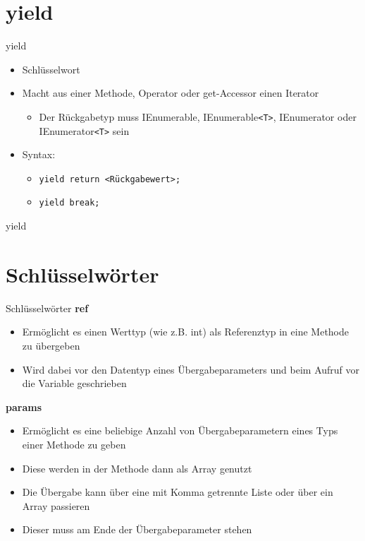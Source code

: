 \section{yield}
\begin{frame}{yield}
	\begin{itemize}
		\item Schlüsselwort
		\item Macht aus einer Methode, Operator oder get-Accessor einen Iterator
		\begin{itemize}
			\item Der Rückgabetyp muss \alert{IEnumerable}, \alert{IEnumerable\texttt{<T>}}, \alert{IEnumerator} oder \alert{IEnumerator\texttt{<T>}} sein
		\end{itemize}
		\item Syntax:
		\begin{itemize}
			\item \texttt{\alert{yield} return \alert{<Rückgabewert>};}
			\item \texttt{\alert{yield} break;}
		\end{itemize}
	\end{itemize}
\end{frame}

\begin{frame}{yield}
		
\end{frame}

\section{Schlüsselwörter}
\begin{frame}{Schlüsselwörter}
	\textbf{ref}\\
	\begin{itemize}
		\item Ermöglicht es einen Werttyp (wie z.B. int) als Referenztyp in eine Methode zu übergeben
		\item Wird dabei vor den Datentyp eines Übergabeparameters und beim Aufruf vor die Variable geschrieben
	\end{itemize}
	\textbf{params}\\
	\begin{itemize}
		\item Ermöglicht es eine beliebige Anzahl von Übergabeparametern eines Typs einer Methode zu geben
		\item Diese werden in der Methode dann als Array genutzt
		\item Die Übergabe kann über eine mit Komma getrennte Liste oder über ein Array passieren
		\item Dieser muss am Ende der Übergabeparameter stehen
	\end{itemize}
\end{frame}

